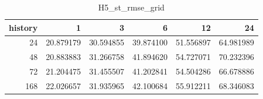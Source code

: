 \begin{table}
\caption{H5_st_rmse_grid}
\label{tab:H5_st_rmse_grid}
\begin{tabular}{rrrrrr}
\toprule
history & 1 & 3 & 6 & 12 & 24 \\
\midrule
24 & 20.879179 & 30.594855 & 39.874100 & 51.556897 & 64.981989 \\
48 & 20.883883 & 31.266758 & 41.894620 & 54.727071 & 70.232396 \\
72 & 21.204475 & 31.455507 & 41.202841 & 54.504286 & 66.678886 \\
168 & 22.026657 & 31.935965 & 42.100684 & 55.912211 & 68.346083 \\
\bottomrule
\end{tabular}
\end{table}
